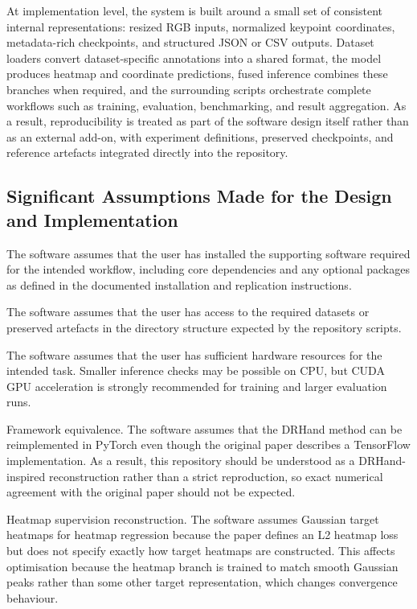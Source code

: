﻿\documentclass[11pt,a4paper]{article}
\begin{document}
\medskip

At implementation level, the system is built around a small set of consistent internal representations: resized RGB inputs, normalized keypoint coordinates, metadata-rich checkpoints, and structured JSON or CSV outputs. Dataset loaders convert dataset-specific annotations into a shared format, the model produces heatmap and coordinate predictions, fused inference combines these branches when required, and the surrounding scripts orchestrate complete workflows such as training, evaluation, benchmarking, and result aggregation. As a result, reproducibility is treated as part of the software design itself rather than as an external add-on, with experiment definitions, preserved checkpoints, and reference artefacts integrated directly into the repository.

\subsection{Significant Assumptions Made for the Design and Implementation}

The software assumes that the user has installed the supporting software
required for the intended workflow, including core dependencies and any
optional packages as defined in the documented installation and
replication instructions.

\medskip

The software assumes that the user has access to the required datasets or
preserved artefacts in the directory structure expected by the repository
scripts.

\medskip

The software assumes that the user has sufficient hardware resources for the
intended task. Smaller inference checks may be possible on CPU, but CUDA GPU acceleration is
strongly recommended for training and larger evaluation runs.

\medskip

Framework equivalence. The software assumes that the DRHand method can be reimplemented in PyTorch even though the original paper describes a TensorFlow implementation. As a result, this repository should be understood as a DRHand-inspired reconstruction rather than a strict reproduction, so exact numerical agreement with the original paper should not be expected.

\medskip

Heatmap supervision reconstruction. The software assumes Gaussian target heatmaps for heatmap regression because the paper defines an L2 heatmap loss but does not specify exactly how target heatmaps are constructed. This affects optimisation because the heatmap branch is trained to match smooth Gaussian peaks rather than some other target representation, which changes convergence behaviour.
\end{document}
